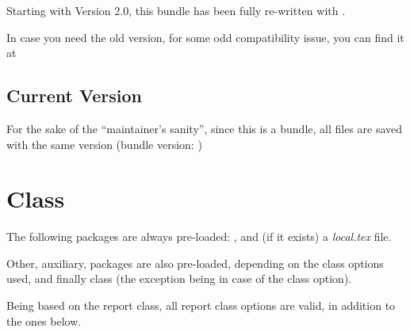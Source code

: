 \documentclass[article,nogeometry,english,tocdepth=3,secdepth=3]{ufrgscca} %
\begin{document}
\begin{tsremark}
	Starting with Version 2.0, this bundle has been fully re-written with .
\end{tsremark}

\begin{tsremark}[Version 1.12a:]
	In case you need the old version, for some odd  compatibility issue, you can find it at 
\end{tsremark}

\subsection{Current Version}
For the sake of the “maintainer's sanity”, since this is a bundle, all files are saved with the same version (bundle version: )

\section{ Class}

The following packages are always pre-loaded: ,  and (if it exists) a \emph{local.tex} file.

Other, auxiliary, packages are also pre-loaded, depending on the class options used, and finally   class (the exception being in case of the  class option).

Being based on the report class, all report class options are valid, in addition to the ones below.
\end{document}
